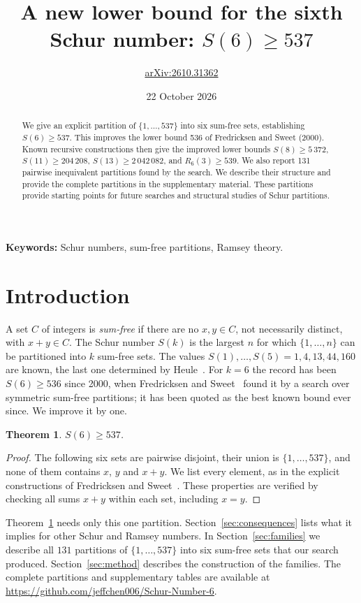 \documentclass[11pt,a4paper]{article}
\title{A new lower bound for the sixth Schur number: $S(6)\ge537$}
\author{\small\href{https://arxiv.org/abs/2610.31362}{arXiv:2610.31362}}
\date{22 October 2026}
\newtheorem{theorem}{Theorem}
\theoremstyle{definition}
\begin{document}
\maketitle

\begin{abstract}
We give an explicit partition of $\{1,\ldots,537\}$ into six sum-free sets,
establishing $S(6)\ge537$. This improves the lower bound 536 of Fredricksen and
Sweet (2000). Known recursive constructions then give the improved lower bounds
$S(8)\ge5\,372$, $S(11)\ge204\,208$, $S(13)\ge2\,042\,082$, and
$R_6(3)\ge539$. We also report 131 pairwise
inequivalent partitions found by the search. We describe their structure and
provide the complete partitions in the supplementary material. These partitions
provide starting points for future searches and structural studies of Schur partitions.
\end{abstract}
\noindent\textbf{Keywords:} Schur numbers, sum-free partitions, Ramsey theory.

\section{Introduction}
A set $C$ of integers is \emph{sum-free} if there are no $x,y\in C$, not necessarily
distinct, with $x+y\in C$. The Schur number $S(k)$ is the largest $n$ for which
$\{1,\dots,n\}$ can be partitioned into $k$ sum-free sets. The values
$S(1),\dots,S(5)=1,4,13,44,160$ are known, the last one determined by
Heule~\cite{heule}. For $k=6$ the record has been $S(6)\ge536$ since 2000, when
Fredricksen and Sweet~\cite{fs} found it by a search over symmetric sum-free
partitions; it has been quoted as the best known bound ever since. We improve it
by one.

\begin{theorem}\label{thm:537}
$S(6)\ge 537$.
\end{theorem}

\begin{proof}
The following six sets are pairwise disjoint, their union is $\{1,\dots,537\}$, and
none of them contains $x$, $y$ and $x+y$. We list every element, as in the
explicit constructions of Fredricksen and Sweet~\cite{fs}. These properties
are verified by checking all sums $x+y$ within each set, including $x=y$.
\par\smallskip

\end{proof}

Theorem~\ref{thm:537} needs only this one partition. Section~\ref{sec:consequences}
lists what it implies for other Schur and Ramsey numbers. In Section~\ref{sec:families} we
describe all $131$ partitions of $\{1,\dots,537\}$ into six sum-free sets that our
search produced.
Section~\ref{sec:method} describes the construction of the families.
The complete partitions and supplementary tables are available at
\url{https://github.com/jeffchen006/Schur-Number-6}.
\end{document}
